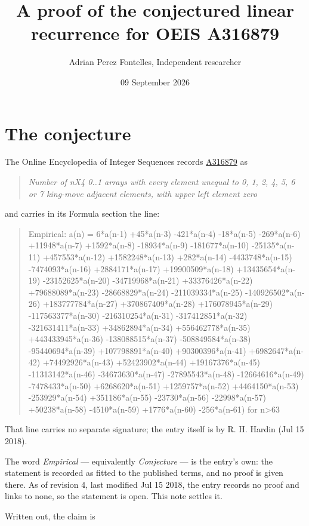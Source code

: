 \documentclass[11pt]{article}
\title{A proof of the conjectured linear recurrence for OEIS A316879}
\author{Adrian Perez Fontelles, Independent researcher}
\date{09 September 2026}
\theoremstyle{definition}
\begin{document}
\maketitle
\section{The conjecture}

The Online Encyclopedia of Integer Sequences records \href{https://oeis.org/A316879}{A316879} as

\begin{quote}\itshape Number of nX4 0..1 arrays with every element unequal to 0, 1, 2, 4, 5, 6 or 7 king-move adjacent elements, with upper left element zero\end{quote}

and carries in its Formula section the line:

\begin{quote}\ttfamily Empirical: a(n) = 6*a(n-1) +45*a(n-3) -421*a(n-4) -18*a(n-5) -269*a(n-6) +11948*a(n-7) +1592*a(n-8) -18934*a(n-9) -181677*a(n-10) -25135*a(n-11) +457553*a(n-12) +1582248*a(n-13) +282*a(n-14) -4433748*a(n-15) -7474093*a(n-16) +2884171*a(n-17) +19900509*a(n-18) +13435654*a(n-19) -23152625*a(n-20) -34719968*a(n-21) +33376426*a(n-22) +79688089*a(n-23) -28668829*a(n-24) -211039334*a(n-25) -140926502*a(n-26) +183777784*a(n-27) +370867409*a(n-28) +176078945*a(n-29) -117563377*a(n-30) -216310254*a(n-31) -317412851*a(n-32) -321631411*a(n-33) +34862894*a(n-34) +556462778*a(n-35) +443433945*a(n-36) -138088515*a(n-37) -508849584*a(n-38) -95440694*a(n-39) +107798891*a(n-40) +90300396*a(n-41) +6982647*a(n-42) +74492926*a(n-43) +52423902*a(n-44) +19167376*a(n-45) -11313142*a(n-46) -34673630*a(n-47) -27895543*a(n-48) -12664616*a(n-49) -7478433*a(n-50) +6268620*a(n-51) +1259757*a(n-52) +4464150*a(n-53) -253929*a(n-54) +351186*a(n-55) -23730*a(n-56) -22998*a(n-57) +50238*a(n-58) -4510*a(n-59) +1776*a(n-60) -256*a(n-61) for n>63\end{quote}

That line carries no separate signature; the entry itself is by R. H. Hardin (Jul 15 2018).

The word {\itshape Empirical} --- equivalently {\itshape Conjecture} --- is the entry's own: the statement is recorded as fitted to the published terms, and no proof is given there. As of revision 4, last modified Jul 15 2018, the entry records no proof and links to none, so the statement is open. This note settles it.

Written out, the claim is
\end{document}
